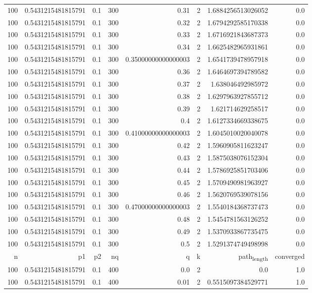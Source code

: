 \documentclass[11pt]{article}
\begin{document}
\begin{center}
\begin{tabular}{rrrrrrrr}
100 & 0.5431215481815791 & 0.1 & 300 & 0.31 & 2 & 1.6884256513026052 & 0.0\\
100 & 0.5431215481815791 & 0.1 & 300 & 0.32 & 2 & 1.6794292585170338 & 0.0\\
100 & 0.5431215481815791 & 0.1 & 300 & 0.33 & 2 & 1.6716921843687373 & 0.0\\
100 & 0.5431215481815791 & 0.1 & 300 & 0.34 & 2 & 1.6625482965931861 & 0.0\\
100 & 0.5431215481815791 & 0.1 & 300 & 0.35000000000000003 & 2 & 1.6541739478957918 & 0.0\\
100 & 0.5431215481815791 & 0.1 & 300 & 0.36 & 2 & 1.6464697394789582 & 0.0\\
100 & 0.5431215481815791 & 0.1 & 300 & 0.37 & 2 & 1.638046492985972 & 0.0\\
100 & 0.5431215481815791 & 0.1 & 300 & 0.38 & 2 & 1.6297963927855712 & 0.0\\
100 & 0.5431215481815791 & 0.1 & 300 & 0.39 & 2 & 1.621714629258517 & 0.0\\
100 & 0.5431215481815791 & 0.1 & 300 & 0.4 & 2 & 1.6127334669338675 & 0.0\\
100 & 0.5431215481815791 & 0.1 & 300 & 0.41000000000000003 & 2 & 1.6045010020040078 & 0.0\\
100 & 0.5431215481815791 & 0.1 & 300 & 0.42 & 2 & 1.5960905811623247 & 0.0\\
100 & 0.5431215481815791 & 0.1 & 300 & 0.43 & 2 & 1.5875038076152304 & 0.0\\
100 & 0.5431215481815791 & 0.1 & 300 & 0.44 & 2 & 1.5786925851703406 & 0.0\\
100 & 0.5431215481815791 & 0.1 & 300 & 0.45 & 2 & 1.5709490981963927 & 0.0\\
100 & 0.5431215481815791 & 0.1 & 300 & 0.46 & 2 & 1.5620769539078156 & 0.0\\
100 & 0.5431215481815791 & 0.1 & 300 & 0.47000000000000003 & 2 & 1.5540184368737473 & 0.0\\
100 & 0.5431215481815791 & 0.1 & 300 & 0.48 & 2 & 1.5454781563126252 & 0.0\\
100 & 0.5431215481815791 & 0.1 & 300 & 0.49 & 2 & 1.5370933867735475 & 0.0\\
100 & 0.5431215481815791 & 0.1 & 300 & 0.5 & 2 & 1.5291374749498998 & 0.0\\
\hline
n & p1 & p2 & nq & q & k & path\textsubscript{length} & converged\\
100 & 0.5431215481815791 & 0.1 & 400 & 0.0 & 2 & 0.0 & 1.0\\
100 & 0.5431215481815791 & 0.1 & 400 & 0.01 & 2 & 0.5515097384529771 & 1.0\\

\end{tabular}
\end{center}
\end{document}
